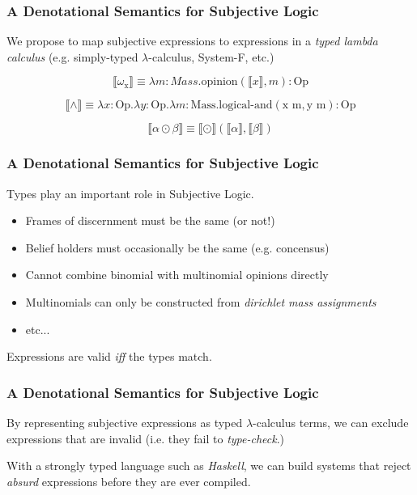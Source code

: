 \documentclass{beamer}
\begin{document}
\begin{frame}
\frametitle{A Denotational Semantics for Subjective Logic}

We propose to map subjective expressions to expressions in a \emph{typed lambda calculus}
(e.g. simply-typed $\lambda$-calculus, System-F, etc.)

$$
\llbracket \omega_{\mbox{x}} \rrbracket
    \equiv \lambda m : Mass. \mbox{opinion}\left(\llbracket x\rrbracket, m\right): \mbox{Op}
$$

$$
\llbracket \land \rrbracket
    \equiv \lambda x:\mbox{Op}.
             \lambda y:\mbox{Op}.
               \lambda m:\mbox{Mass}.
                 \mbox{logical-and}(\mbox{x m}, \mbox{y m}) : \mbox{Op}
$$

$$
\llbracket \alpha \odot \beta \rrbracket
    \equiv \llbracket \odot \rrbracket \left(\llbracket \alpha \rrbracket, \llbracket \beta \rrbracket\right)
$$

\end{frame}

\begin{frame}
\frametitle{A Denotational Semantics for Subjective Logic}

Types play an important role in Subjective Logic.

\begin{itemize}
  \item Frames of discernment must be the same (or not!)
  \item Belief holders must occasionally be the same (e.g. concensus)
  \item Cannot combine binomial with multinomial opinions directly
  \item Multinomials can only be constructed from \emph{dirichlet mass assignments}
  \item etc...
\end{itemize}

Expressions are valid \emph{iff} the types match.

\end{frame}

\begin{frame}
\frametitle{A Denotational Semantics for Subjective Logic}

By representing subjective expressions as typed $\lambda$-calculus terms, we can exclude
expressions that are invalid (i.e. they fail to \emph{type-check}.)

With a strongly typed language such as \emph{Haskell}, we can build systems that reject
\emph{absurd} expressions before they are ever compiled.

\end{frame}
\end{document}
